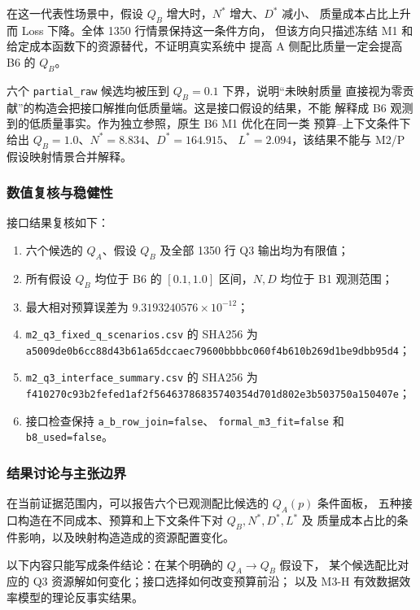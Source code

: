 在这一代表性场景中，假设 $Q_B$ 增大时，$N^*$ 增大、$D^*$ 减小、
质量成本占比上升而 Loss 下降。全体 1350 行情景保持这一条件方向，
但该方向只描述冻结 M1 和给定成本函数下的资源替代，不证明真实系统中
提高 A 侧配比质量一定会提高 B6 的 $Q_B$。

六个 \texttt{partial\_raw} 候选均被压到 $Q_B=0.1$ 下界，说明“未映射质量
直接视为零贡献”的构造会把接口解推向低质量端。这是接口假设的结果，不能
解释成 B6 观测到的低质量事实。作为独立参照，原生 B6 M1 优化在同一类
预算--上下文条件下给出 $Q_B=1.0$、$N^*=8.834$、$D^*=164.915$、
$L^*=2.094$，该结果不能与 M2/P 假设映射情景合并解释。

\subsubsection{数值复核与稳健性}

接口结果复核如下：
\begin{enumerate}
  \item 六个候选的 $Q_A$、假设 $Q_B$ 及全部 1350 行 Q3 输出均为有限值；
  \item 所有假设 $Q_B$ 均位于 B6 的 $[0.1,1.0]$ 区间，$N,D$ 均位于
  B1 观测范围；
  \item 最大相对预算误差为 $9.3193240576\times10^{-12}$；
  \item \texttt{m2\_q3\_fixed\_q\_scenarios.csv} 的 SHA256 为
  {\scriptsize\texttt{a5009de0b6cc88d43b61a65dccaec79600bbbbc060f4b610b269d1be9dbb95d4}}；
  \item \texttt{m2\_q3\_interface\_summary.csv} 的 SHA256 为
  {\scriptsize\texttt{f410270c93b2fefed1af2f56463786835740354d701d802e3b503750a150407e}}；
  \item 接口检查保持 \texttt{a\_b\_row\_join=false}、
  \texttt{formal\_m3\_fit=false} 和 \texttt{b8\_used=false}。
\end{enumerate}

\subsubsection{结果讨论与主张边界}

在当前证据范围内，可以报告六个已观测配比候选的 $Q_A(p)$ 条件面板，
五种接口构造在不同成本、预算和上下文条件下对 $Q_B,N^*,D^*,L^*$ 及
质量成本占比的条件影响，以及映射构造造成的资源配置变化。

以下内容只能写成条件结论：在某个明确的 $Q_A\to Q_B$ 假设下，
某个候选配比对应的 Q3 资源解如何变化；接口选择如何改变预算前沿；
以及 M3-H 有效数据效率模型的理论反事实结果。


